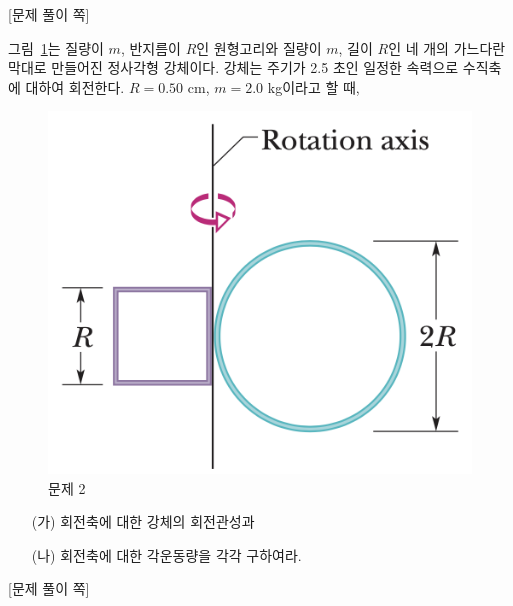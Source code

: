 \documentclass[floatfix,nofootinbib,superscriptaddress,fleqn,preprint]{revtex4}
\begin{document}
 \newpage

{\color{gray} [문제 풀이 쪽]}

\newpage

그림~\ref{fig:2}는 질량이 $m$, 반지름이 $R$인 원형고리와 질량이 $m$,
길이 $R$인 네 개의 가느다란 막대로 만들어진 정사각형 강체이다. 강체는
주기가 2.5 초인 일정한 속력으로 수직축에 대하여 회전한다. $R=0.50$ cm,
$m=2.0$ kg이라고 할 때,
\begin{figure}[ht]
  \centering
\includegraphics[scale=0.4]{Qfig14-2-20220427.png}
  \caption{문제 2}
  \label{fig:2}
\end{figure}
\begin{itemize}
\item[(가)] 회전축에 대한 강체의 회전관성과
\item[(나)] 회전축에 대한 각운동량을 각각 구하여라.   
\end{itemize}
\newpage
{\color{gray} [문제 풀이 쪽]}

\newpage
\end{document}
